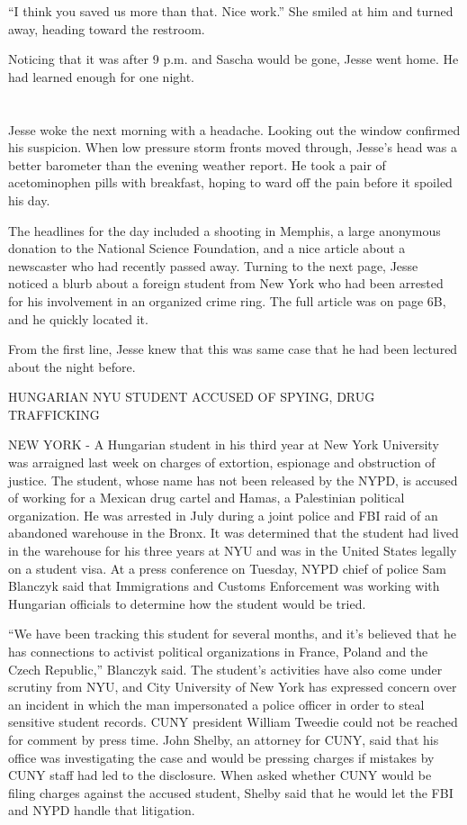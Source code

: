 \documentclass[12pt]{book}
\begin{document}
``I think you saved us more than that.  Nice work.''  She smiled at him and turned away, heading toward the restroom.

Noticing that it was after 9 p.m. and Sascha would be gone, Jesse went home.  He had learned enough for one night.

\chapter{}

Jesse woke the next morning with a headache.  Looking out the window confirmed his suspicion.  When low pressure storm fronts moved through, Jesse's head was a better barometer than the evening weather report.  He took a pair of acetominophen pills with breakfast, hoping to ward off the pain before it spoiled his day.

The headlines for the day included a shooting in Memphis, a large anonymous donation to the National Science Foundation, and a nice article about a newscaster who had recently passed away.  Turning to the next page, Jesse noticed a blurb about a foreign student from New York who had been arrested for his involvement in an organized crime ring.  The full article was on page 6B, and he quickly located it.

From the first line, Jesse knew that this was same case that he had been lectured about the night before.

\indent	HUNGARIAN NYU STUDENT ACCUSED OF SPYING, DRUG TRAFFICKING

\indent NEW YORK - A Hungarian student in his third year at New York University was arraigned last week on charges of extortion, espionage and obstruction of justice.  The student, whose name has not been released by the NYPD, is accused of working for a Mexican drug cartel and Hamas, a Palestinian political organization.  He was arrested in July during a joint police and FBI raid of an abandoned warehouse in the Bronx.  It was determined that the student had lived in the warehouse for his three years at NYU and was in the United States legally on a student visa.  At a press conference on Tuesday, NYPD chief of police Sam Blanczyk said that Immigrations and Customs Enforcement was working with Hungarian officials to determine how the student would be tried.
	
\indent ``We have been tracking this student for several months, and it's believed that he has connections to activist political organizations in France, Poland and the Czech Republic,'' Blanczyk said.  The student's activities have also come under scrutiny from NYU, and City University of New York has expressed concern over an incident in which the man impersonated a police officer in order to steal sensitive student records.  CUNY president William Tweedie could not be reached for comment by press time.  John Shelby, an attorney for CUNY, said that his office was investigating the case and would be pressing charges if mistakes by CUNY staff had led to the disclosure.  When asked whether CUNY would be filing charges against the accused student, Shelby said that he would let the FBI and NYPD handle that litigation.
	
\end{document}
